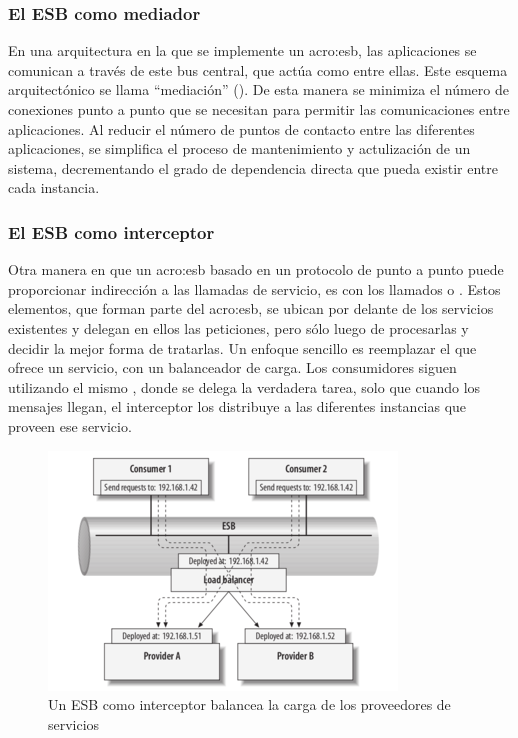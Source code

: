 \subsubsection{El ESB como mediador}

En una arquitectura en la que se implemente un \gls{acro:esb}, las aplicaciones se comunican a través de este bus central, que actúa como  entre ellas. Este esquema arquitectónico se llama ``mediación'' (). De esta manera se minimiza el número de conexiones punto a punto que se necesitan para permitir las comunicaciones entre aplicaciones. Al reducir el número de puntos de contacto entre las diferentes aplicaciones, se simplifica el proceso de mantenimiento y actulización de un sistema, decrementando el grado de dependencia directa que pueda existir entre cada instancia.


\subsubsection{El ESB como interceptor}

Otra manera en que un \gls{acro:esb} basado en un protocolo de punto a punto puede proporcionar indirección a las llamadas de servicio, es con los llamados  o . Estos elementos, que forman parte del \gls{acro:esb}, se ubican por delante de los servicios existentes y delegan en ellos las peticiones, pero sólo luego de procesarlas y decidir la mejor forma de tratarlas. Un enfoque sencillo es reemplazar el  que ofrece un servicio, con un balanceador de carga. Los consumidores siguen utilizando el mismo , donde se delega la verdadera tarea, solo que cuando los mensajes llegan, el interceptor los distribuye a las diferentes instancias que proveen ese servicio\cite[p.~52]{josuttis2007}.

\begin{figure}[H]
  \includegraphics[width=\linewidth]{src/images/03-capitulo-3/tecnologias/esb/esb-interceptors-load-balancer.png}
  \caption{Un ESB como interceptor balancea la carga de los proveedores de servicios}
  \label{fig:esb-interceptors-load-balancer}
\end{figure}
